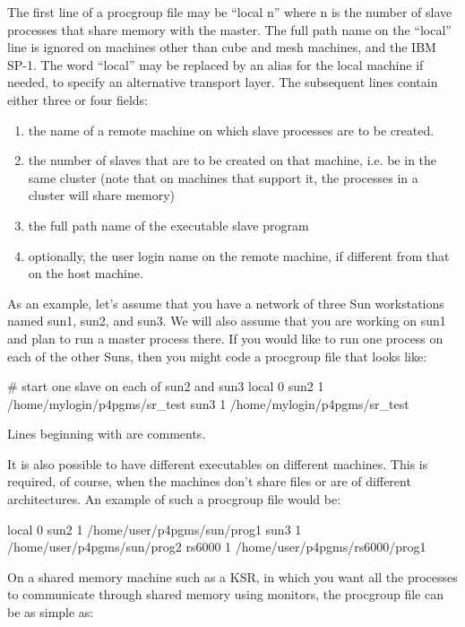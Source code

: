 The first line of a procgroup file may be ``local n'' where n is the number
of slave processes that share memory with the master.  The full path
name on the ``local'' line is ignored on machines other than cube and mesh
machines, and the IBM SP-1.  The word ``local'' may be replaced by an alias
for the local machine if needed, to specify an alternative transport layer.
The subsequent lines contain either three or four
fields:
\begin{enumerate}
\item
the name of a remote machine on which slave processes are to be created.
\item
the number of slaves that are to be created on that machine, 
i.e. be in the same cluster (note that on machines that support it, 
the processes in a cluster will share memory)
\item
the full path name of the executable slave program
\item
optionally, the user login name on the remote machine, if different from 
that on the host machine.
\end{enumerate}

As an example, let's assume that you have a network of three Sun 
workstations named sun1, sun2, and sun3.  We will also assume that you 
are working on sun1 and plan to run a master process there.  
If you would like to run one process on each of the other Suns, then you 
might code a procgroup file that looks like:

\begin{example}
    # start one slave on each of sun2 and sun3
    local 0 
    sun2  1  /home/mylogin/p4pgms/sr_test
    sun3  1  /home/mylogin/p4pgms/sr_test
\end{example}

Lines beginning with \code{#} are comments.

It is also possible to have different executables on different machines.  This
is required, of course, when the machines don't share files or are of
different architectures.  An example of such a procgroup file would be:

\begin{example}
    local   0
    sun2    1  /home/user/p4pgms/sun/prog1
    sun3    1  /home/user/p4pgms/sun/prog2
    rs6000  1  /home/user/p4pgms/rs6000/prog1
\end{example}

On a shared memory machine such as a KSR, in which you want all the processes
to communicate through shared memory using monitors, the procgroup file can be
as simple as:


